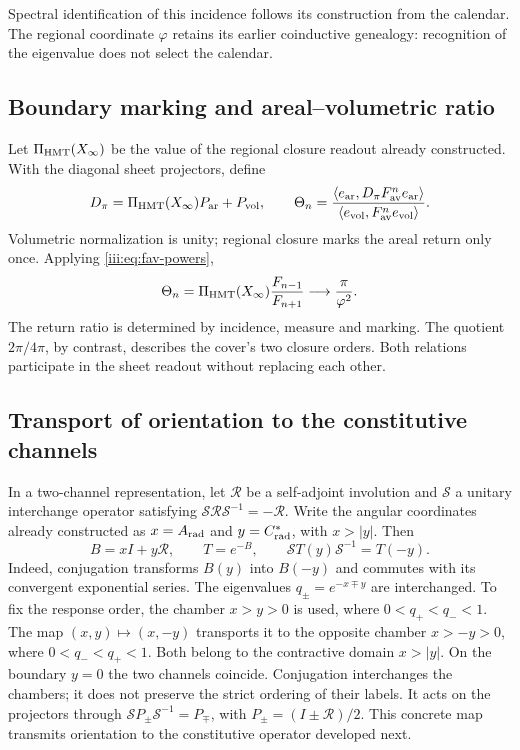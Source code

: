Spectral identification of this incidence follows its construction
from the calendar. The regional coordinate $\varphi$ retains its earlier coinductive
genealogy: recognition of the eigenvalue does not select the calendar.

\subsection{Boundary marking and areal--volumetric ratio}

Let $\Pi_{\rm HMT}(X_\infty)$ be the value of the regional closure readout already
constructed. With the diagonal sheet projectors, define
\begin{equation}
 D_\pi=\Pi_{\rm HMT}(X_\infty)P_{\rm ar}+P_{\rm vol},\qquad
 \Theta_n=
 \frac{\langle e_{\rm ar},D_\pi F_{\rm av}^{n}e_{\rm ar}\rangle}
 {\langle e_{\rm vol},F_{\rm av}^{n}e_{\rm vol}\rangle}.
 \label{iii:eq:marked-return}
\end{equation}
Volumetric normalization is unity; regional closure marks the
areal return only once. Applying \eqref{iii:eq:fav-powers},
\begin{equation}
 \Theta_n=\Pi_{\rm HMT}(X_\infty)\frac{F_{n-1}}{F_{n+1}}
 \longrightarrow\frac{\pi}{\varphi^2}.
 \label{iii:eq:av-limit}
\end{equation}
The return ratio is determined by incidence, measure and marking.
The quotient $2\pi/4\pi$, by contrast, describes the cover's two closure orders.
Both relations participate in the sheet readout without replacing each other.

\subsection{Transport of orientation to the constitutive channels}

In a two-channel representation, let $\mathcal R$ be a self-adjoint
involution and $\mathcal S$ a unitary interchange operator satisfying
$\mathcal S\mathcal R\mathcal S^{-1}=-\mathcal R$. Write the angular coordinates
already constructed as $x=A_{\rm rad}$ and $y=C^*_{\rm rad}$, with $x>|y|$.
Then
\begin{equation}
 B=xI+y\mathcal R,\qquad T=e^{-B},\qquad
 \mathcal ST(y)\mathcal S^{-1}=T(-y).
 \label{iii:eq:channel-conjugation}
\end{equation}
Indeed, conjugation transforms $B(y)$ into $B(-y)$ and commutes with its convergent
exponential series. The eigenvalues $q_\pm=e^{-x\mp y}$ are interchanged.
To fix the response order, the chamber $x>y>0$ is used, where
$0<q_+<q_-<1$. The map $(x,y)\mapsto(x,-y)$ transports it to the
opposite chamber $x>-y>0$, where $0<q_-<q_+<1$. Both belong to the
contractive domain $x>|y|$. On the boundary $y=0$ the two channels coincide.
Conjugation interchanges the chambers; it does not preserve the strict ordering of
their labels. It acts on the projectors through
$\mathcal SP_\pm\mathcal S^{-1}=P_\mp$, with
$P_\pm=(I\pm\mathcal R)/2$.
This concrete map transmits orientation to the constitutive operator
developed next.
